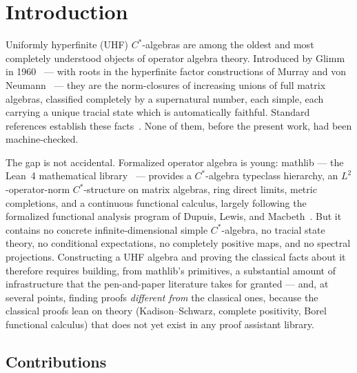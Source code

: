 \documentclass[11pt,a4paper]{amsart}
\theoremstyle{plain}
\theoremstyle{definition}
\begin{document}
\maketitle

\tableofcontents

\section{Introduction}\label{sec:intro}

Uniformly hyperfinite (UHF) $C^*$-algebras are among the oldest and most
completely understood objects of operator algebra theory. Introduced by
Glimm in 1960~\cite{glimm1960} --- with roots in the hyperfinite factor
constructions of Murray and von Neumann~\cite{murray-vonneumann1936} ---
they are the norm-closures of increasing unions of full matrix algebras,
classified completely by a supernatural number, each simple, each carrying
a unique tracial state which is automatically faithful. Standard
references establish these facts~\cite{davidson1996, blackadar2006,
takesaki1979}. None of them, before the present work, had been
machine-checked.

The gap is not accidental. Formalized operator algebra is young: mathlib
--- the Lean~4 mathematical library~\cite{mathlib2020,moura-ullrich2021}
--- provides a $C^*$-algebra typeclass hierarchy, an $L^2$-operator-norm
$C^*$-structure on matrix algebras, ring direct limits, metric completions,
and a continuous functional calculus, largely following the formalized
functional analysis program of Dupuis, Lewis, and
Macbeth~\cite{dupuis-lewis-macbeth2022}. But it contains no concrete
infinite-dimensional simple $C^*$-algebra, no tracial state theory, no
conditional expectations, no completely positive maps, and no spectral
projections. Constructing a UHF algebra and proving the classical facts
about it therefore requires building, from mathlib's primitives, a
substantial amount of infrastructure that the pen-and-paper literature
takes for granted --- and, at several points, finding proofs
\emph{different from} the classical ones, because the classical proofs
lean on theory (Kadison--Schwarz, complete positivity, Borel functional
calculus) that does not yet exist in any proof assistant library.

\subsection{Contributions}\label{sec:contributions}
\end{document}
